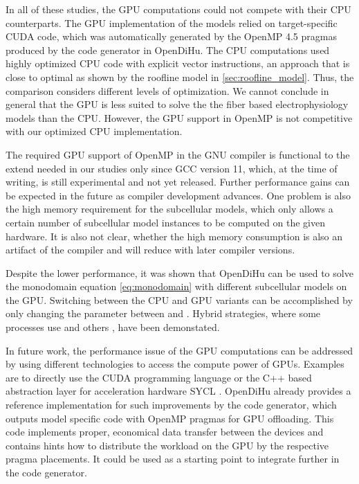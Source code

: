 In all of these studies, the GPU computations could not compete with their CPU counterparts. The GPU implementation of the models relied on target-specific CUDA code, which was automatically generated by the OpenMP 4.5 pragmas produced by the code generator in OpenDiHu. The CPU computations used highly optimized CPU code with explicit vector instructions, an approach that is close to optimal as shown by the roofline model in \cref{sec:roofline_model}. Thus, the comparison considers different levels of optimization. We cannot conclude in general that the GPU is less suited to solve the the fiber based electrophysiology models than the CPU. However, the GPU support in OpenMP is not competitive with our optimized CPU implementation.

The required GPU support of OpenMP in the GNU compiler is functional to the extend needed in our studies only since GCC version 11, which, at the time of writing, is still experimental and not yet released. Further performance gains can be expected in the future as compiler development advances. One problem is also the high memory requirement for the subcellular models, which only allows a certain number of subcellular model instances to be computed on the given hardware. It is also not clear, whether the high memory consumption is also an artifact of the compiler and will reduce with later compiler versions.

Despite the lower performance, it was shown that OpenDiHu can be used to solve the monodomain equation \cref{eq:monodomain} with different subcellular models on the GPU. Switching between the CPU and GPU variants can be accomplished by only changing the  parameter between  and . Hybrid strategies, where some processes use  and others , have been demonstated.

In future work, the performance issue of the GPU computations can be addressed by using different technologies to access the compute power of GPUs.
Examples are to directly use the CUDA programming language or the C++ based abstraction layer for acceleration hardware SYCL \cite{sycl}. OpenDiHu already provides a reference implementation for such improvements by the code generator, which outputs model specific code with OpenMP pragmas for GPU offloading. This code implements proper, economical data transfer between the devices and contains hints how to distribute the workload on the GPU by the respective pragma placements. It could be used as a starting point to integrate further  in the code generator.

